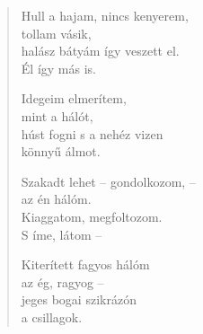 \documentclass[11pt]{book}
\newcommand*{\centeredornament}{\centerline{\pgfornament[width=6cm]{88}}}
\begin{document}
\newpage

\vspace*{-15mm}
\centeredornament



\begin{verse}
  Hull a hajam, nincs kenyerem, \\
  tollam vásik, \\
  halász bátyám így veszett el. \\
  Él így más is.

  Idegeim elmerítem, \\
  mint a hálót, \\
  húst fogni s a nehéz vizen \\
  könnyű álmot.

  Szakadt lehet -- gondolkozom, -- \\
  az én hálóm. \\
  Kiaggatom, megfoltozom. \\
  S íme, látom --

  Kiterített fagyos hálóm \\
  az ég, ragyog -- \\
  jeges bogai szikrázón \\
  a csillagok.
\end{verse}

\newpage

\vspace*{-15mm}
\centeredornament


\end{document}
